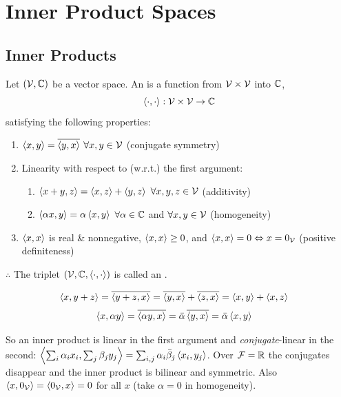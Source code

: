 \section{Inner Product Spaces}\label{sec:ips}
\subsection{Inner Products}\label{ss:inner-products}
\begin{definition}
Let $(\mathcal{V},\mathbb{C})$ be a vector space. An  is a function from $\mathcal{V}\times\mathcal{V}$ into $\mathbb{C}$,
\[
\left\langle \cdot, \cdot \right\rangle : \mathcal{V}\times\mathcal{V}\to\mathbb{C}
\]
satisfying the following properties:
\begin{enumerate}[label=\arabic*)]
\item $\left\langle x, y \right\rangle = \overline{\left\langle y, x \right\rangle}$ \quad $\forall x,y\in\mathcal{V}$ \hfill (conjugate symmetry)
\item Linearity with respect to (w.r.t.) the first argument:
  \begin{enumerate}[label=\alph*)]
  \item $\left\langle x+y, z \right\rangle = \left\langle x, z \right\rangle + \left\langle y, z \right\rangle$ \quad $\forall x,y,z\in\mathcal{V}$ \hfill (additivity)
  \item $\left\langle \alpha x, y \right\rangle = \alpha\left\langle x, y \right\rangle$ \quad $\forall\alpha\in\mathbb{C}$ and $\forall x,y\in\mathcal{V}$ \hfill (homogeneity)
  \end{enumerate}
\item $\left\langle x, x \right\rangle$ is real \& nonnegative, $\left\langle x, x \right\rangle\ge 0$, and
  $\left\langle x, x \right\rangle = 0 \Leftrightarrow x = 0_{\mathcal{V}}$ \hfill (positive definiteness)
\end{enumerate}
$\therefore$ The triplet $(\mathcal{V},\mathbb{C},\left\langle \cdot, \cdot \right\rangle)$ is called an .
\end{definition}
\begin{align*}
\left\langle x, y+z \right\rangle &= \overline{\left\langle y+z, x \right\rangle} = \overline{\left\langle y, x \right\rangle} + \overline{\left\langle z, x \right\rangle} = \left\langle x, y \right\rangle + \left\langle x, z \right\rangle
\end{align*}
\begin{align*}
\left\langle x, \alpha y \right\rangle &= \overline{\left\langle \alpha y, x \right\rangle} = \bar\alpha\,\overline{\left\langle y, x \right\rangle} = \bar\alpha\left\langle x, y \right\rangle
\end{align*}
\begin{insight}
So an inner product is linear in the first argument and \emph{conjugate}-linear in the second:
$\left\langle \textstyle\sum_i\alpha_i x_i, \sum_j\beta_j y_j \right\rangle = \sum_{i,j}\alpha_i\bar\beta_j\left\langle x_i, y_j \right\rangle$.
Over $\mathcal{F}=\mathbb{R}$ the conjugates disappear and the inner product is bilinear and symmetric. Also $\left\langle x, 0_{\mathcal{V}} \right\rangle = \left\langle 0_{\mathcal{V}}, x \right\rangle = 0$ for all $x$ (take $\alpha = 0$ in homogeneity).
\end{insight}

